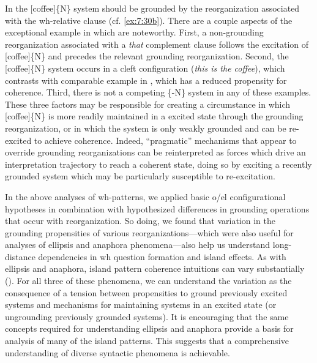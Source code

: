In  the [coffee]\{N\} system should be grounded by the reorganization associated with the wh-relative clause (cf. \ref{ex:7:30b}). There are a couple aspects of the exceptional example in  which are noteworthy. First, a non-grounding reorganization associated with a \textit{that} complement clause follows the excitation of [coffee]\{N\} and precedes the relevant grounding reorganization. Second, the [coffee]\{N\} system occurs in a cleft configuration (\textit{this is the coffee}), which contrasts with comparable example in , which has a reduced propensity for coherence. Third, there is not a competing \{-N\} system in any of these examples. These three factors may be responsible for creating a circumstance in which [coffee]\{N\} is more readily maintained in a excited state through the grounding reorganization, or in which the system is only weakly grounded and can be re-excited to achieve coherence. Indeed, “pragmatic” mechanisms that appear to override grounding reorganizations can be reinterpreted as forces which drive an interpretation trajectory to reach a coherent state, doing so by exciting a recently grounded system which may be particularly susceptible to re-excitation.

In the above analyses of wh-patterns, we applied basic o/el configurational hypotheses in combination with hypothesized differences in grounding operations that occur with reorganization. So doing, we found that variation in the grounding propensities of various reorganizations—which were also useful for analyses of ellipsis and anaphora phenomena—also help us understand long-distance dependencies in wh question formation and island effects. As with ellipsis and anaphora, island pattern coherence intuitions can vary substantially (\citealt{Kluender1998,SprouseHornstein2013,SprouseEtAl2012}). For all three of these phenomena, we can understand the variation as the consequence of a tension between propensities to ground previously excited systems and mechanisms for maintaining systems in an excited state (or ungrounding previously grounded systems). It is encouraging that the same concepts required for understanding ellipsis and anaphora provide a basis for analysis of many of the island patterns. This suggests that a comprehensive understanding of diverse syntactic phenomena is achievable.

